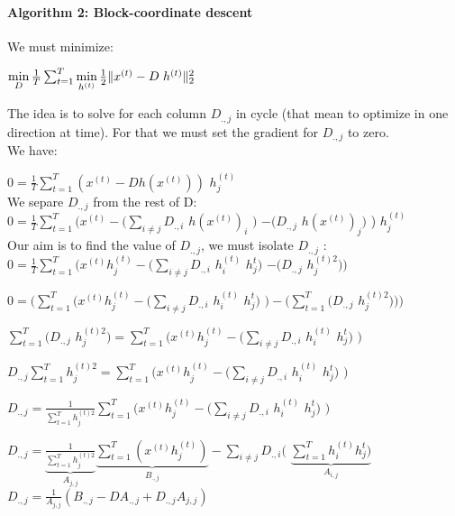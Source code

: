 \documentclass[a4paper,10pt]{article}
\begin{document}
\paragraph{Algorithm 2: Block-coordinate descent}
We must minimize:
\begin{center}
 $\min\limits_{D} \frac{1}{T} \sum_{t=1}^{T}  \min\limits_{h^{(t)}} \frac{1}{2} \| x^{(t)} - D \hspace{3px} h^{(t)} \|_2^2 $\\
\end{center}
The idea is to solve for each column $D_{., j}$ in cycle (that mean to optimize in one direction at time). For that we must set the gradient for $D_{., j}$ to zero.\\
We have:
\begin{center}
 $0 = \frac{1}{T}\sum_{t=1}^{T} (x^{(t)} - D h(x^{(t)}))$ $h^{(t)}_{j}$\\ \vspace{0.4cm}
 We separe $D_{.,j}$ from the rest of D:\\
 $0 = \frac{1}{T}\sum_{t=1}^{T} (x^{(t)} - (\sum_{i \neq j}D_{.,i}$ $h(x^{(t)})_i$ $ )$  $ - (D_{.,j}$ $h(x^{(t)})_j)$ ) $ h^{(t)}_{j}$\\ \vspace{0.4cm}
 Our aim is to find the value of $D_{.,j}$, we must isolate $D_{.,j}$ :\\
 $0 = \frac{1}{T} \sum_{t=1}^{T}(x^{(t)} h^{(t)}_{j} - (\sum_{i \neq j}D_{.,i}$ $h^{(t)}_i$ $h^{t}_{j} )$  $ - (D_{.,j}$ $h^{(t)2}_j))$\\ \vspace{0.2cm}
 
  $0 = (\sum_{t=1}^{T}(x^{(t)} h^{(t)}_{j} - (\sum_{i \neq j}D_{.,i}$ $h^{(t)}_i$ $h^{t}_{j} )$  $) - ( \sum_{t=1}^{T}( D_{.,j}$ $h^{(t)2}_j)))$\\ \vspace{0.2cm}
  
  $  \sum_{t=1}^{T}( D_{.,j}$ $h^{(t)2}_j) = \sum_{t=1}^{T}(x^{(t)} h^{(t)}_{j} - (\sum_{i \neq j}D_{.,i}$ $h^{(t)}_i$ $h^{t}_{j} )$  $) $\\  \vspace{0.2cm}
  
  $ D_{.,j}  \sum_{t=1}^{T} h^{(t)2}_j = \sum_{t=1}^{T}(x^{(t)} h^{(t)}_{j} - (\sum_{i \neq j}D_{.,i}$ $h^{(t)}_i$ $h^{t}_{j} )$  $) $\\ \vspace{0.2cm}
  
$ D_{.,j}  =\frac{1}{ \sum_{t=1}^{T} h^{(t)2}_j} \sum_{t=1}^{T}(x^{(t)} h^{(t)}_{j} - (\sum_{i \neq j}D_{.,i}$ $h^{(t)}_i$ $h^{t}_{j} )$  $) $\\ \vspace{0.2cm}

$ D_{.,j}  =\underbrace{\frac{1}{ \sum_{t=1}^{T} h^{(t)2}_j}}_{A_{j, j}} \underbrace{\sum_{t=1}^{T}(x^{(t)} h^{(t)}_{j})}_{B_{., j}}  - \sum_{i \neq j}D_{., i}($ $\underbrace{\sum_{t=1}^{T} h^{(t)}_i h^{t}_{j} ) }_{A_{i,j}}$\\ \vspace{0.2cm}
$D_{., j} = \frac{1}{A_{j, j}}(B_{., j} - D A_{., j} + D_{., j}A_{j, j})$
\end{center}  
\end{document}

